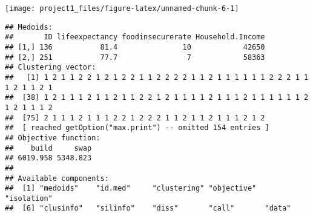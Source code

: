 \documentclass[]{article}
\newenvironment{Shaded}{\begin{snugshade}}{\end{snugshade}}
\newcommand{\ControlFlowTok}[1]{\textcolor[rgb]{0.13,0.29,0.53}{\textbf{#1}}}
\newcommand{\DataTypeTok}[1]{\textcolor[rgb]{0.13,0.29,0.53}{#1}}
\newcommand{\DecValTok}[1]{\textcolor[rgb]{0.00,0.00,0.81}{#1}}
\newcommand{\KeywordTok}[1]{\textcolor[rgb]{0.13,0.29,0.53}{\textbf{#1}}}
\newcommand{\NormalTok}[1]{#1}
\newcommand{\OperatorTok}[1]{\textcolor[rgb]{0.81,0.36,0.00}{\textbf{#1}}}
\newcommand{\StringTok}[1]{\textcolor[rgb]{0.31,0.60,0.02}{#1}}
\begin{document}
\begin{Shaded}
\end{Shaded}

\begin{center}\texttt{[image: project1\_files/figure-latex/unnamed-chunk-6-1]} \end{center}

\begin{Shaded}
\end{Shaded}

\begin{verbatim}
## Medoids:
##       ID lifeexpectancy foodinsecurerate Household.Income
## [1,] 136           81.4               10            42650
## [2,] 251           77.7                7            58363
## Clustering vector:
##   [1] 1 2 1 1 2 2 1 2 1 2 2 1 1 2 2 2 2 1 1 2 1 1 1 1 1 1 2 2 2 1 1 1 2 1 1 2 1
##  [38] 1 2 1 1 1 2 1 1 2 1 1 2 2 1 2 1 1 1 1 2 1 1 1 2 1 1 1 1 1 1 2 1 2 1 1 1 2
##  [75] 2 1 1 1 2 1 1 1 2 2 1 2 2 2 1 1 2 1 1 2 1 1 1 2 1 2
##  [ reached getOption("max.print") -- omitted 154 entries ]
## Objective function:
##    build     swap 
## 6019.958 5348.823 
## 
## Available components:
##  [1] "medoids"    "id.med"     "clustering" "objective"  "isolation" 
##  [6] "clusinfo"   "silinfo"    "diss"       "call"       "data"
\end{verbatim}
\end{document}
